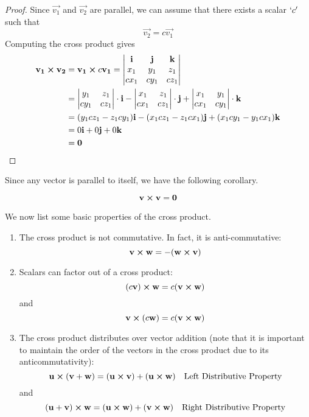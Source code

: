 \documentclass[handout]{ximera}
\begin{document}
\begin{proof}
Since $\vec{v_1}$ and $\vec{v_2}$ are parallel, we can assume that there exists a scalar $`c'$ such that 
\[
\vec{v_2} = c\vec{v_1}
\]
Computing the cross product gives
\begin{align*}
\mathbf{v_1} \boldsymbol\times \mathbf{v_2} &= \mathbf{v_1} \boldsymbol\times c\mathbf{v_1}
                         =  \begin{vmatrix}
                                  \mathbf{i} & \mathbf{j} & \mathbf{k}\\
                                      x_1 & y_1 & z_1\\
                                       cx_1 & cy_1 & cz_1
                            \end{vmatrix} \\
&= \begin{vmatrix}
 y_1 & z_1  \\
 cy_1 & cz_1 \\
 \end{vmatrix} \cdot \mathbf i
 - \begin{vmatrix}
 x_1 & z_1  \\
 cx_1 & cz_1 \\
 \end{vmatrix} \cdot \mathbf j
 + \begin{vmatrix}
 x_1 & y_1  \\
 cx_1 & cy_1 \\
 \end{vmatrix} \cdot \mathbf k\\
 &= (y_1cz_1 - z_1cy_1) \mathbf{i} - (x_1cz_1-z_1cx_1) \mathbf{j} + (x_1cy_1 - y_1cx_1) \mathbf{k}\\
 &=0 \mathbf{i} + 0 \mathbf{j} + 0 \mathbf{k}\\
 &= \mathbf 0
 \end{align*}
 \end{proof}
Since any vector is parallel to itself, we have the following corollary.
\begin{corollary}
\[
\mathbf v \boldsymbol\times \mathbf v = \mathbf 0
\]
\end{corollary}

We now list some basic properties of the cross product.\\

\begin{enumerate}
\item The cross product is not commutative.  In fact, it is anti-commutative:
\[
\mathbf{v} \boldsymbol\times \mathbf{w} = -(\mathbf{w} \boldsymbol\times \mathbf{v})
\]
\item Scalars can factor out of a cross product:
\[
(c\mathbf{v}) \boldsymbol\times \mathbf{w} = c(\mathbf{v} \boldsymbol\times \mathbf{w})
\]
and
\[
\mathbf{v} \boldsymbol\times (c\mathbf{w}) = c(\mathbf{v} \boldsymbol\times \mathbf{w})
\]
\item The cross product distributes over vector addition 
(note that it is important to maintain the order of the vectors in the cross product due to its anticommutativity):
\[
\mathbf{u} \boldsymbol\times (\mathbf{v} + \mathbf{w}) = (\mathbf{u} \boldsymbol\times \mathbf{v}) + (\mathbf{u} \boldsymbol\times \mathbf{w})\quad \text{Left Distributive Property}
\]
and
\[
(\mathbf{u} + \mathbf{v}) \boldsymbol\times \mathbf{w} = (\mathbf{u} \boldsymbol\times \mathbf{w}) + (\mathbf{v} \boldsymbol\times \mathbf{w})\quad \text{Right Distributive Property}
\]
\end{enumerate}
\end{document}
